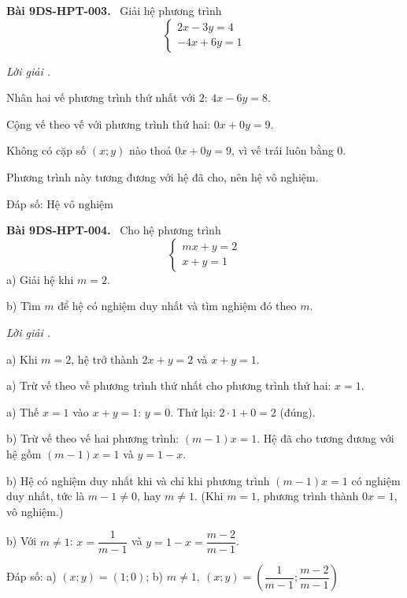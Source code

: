\documentclass[12pt,a4paper]{article}
\newenvironment{problem}[1][]{\par\medskip\noindent\textbf{Bài #1.}\ }{\par}
\newenvironment{solution}[1][]{\par\noindent\textit{Lời giải #1.}\par}{\par}
\begin{document}
\begin{problem}[9DS-HPT-003]
Giải hệ phương trình
\[ \begin{cases} 2x - 3y = 4 \\ -4x + 6y = 1 \end{cases} \]

\begin{solution}
Nhân hai vế phương trình thứ nhất với $2$: $4x - 6y = 8$.

Cộng vế theo vế với phương trình thứ hai: $0x + 0y = 9$.

Không có cặp số $(x; y)$ nào thoả $0x + 0y = 9$, vì vế trái luôn bằng $0$.

Phương trình này tương đương với hệ đã cho, nên hệ vô nghiệm.

Đáp số: $\boxed{\text{Hệ vô nghiệm}}$
\end{solution}
\end{problem}

\begin{problem}[9DS-HPT-004]
Cho hệ phương trình
\[ \begin{cases} mx + y = 2 \\ x + y = 1 \end{cases} \]
a) Giải hệ khi $m = 2$.

b) Tìm $m$ để hệ có nghiệm duy nhất và tìm nghiệm đó theo $m$.

\begin{solution}
a) Khi $m = 2$, hệ trở thành $2x + y = 2$ và $x + y = 1$.

a) Trừ vế theo vế phương trình thứ nhất cho phương trình thứ hai: $x = 1$.

a) Thế $x = 1$ vào $x + y = 1$: $y = 0$. Thử lại: $2 \cdot 1 + 0 = 2$ (đúng).

b) Trừ vế theo vế hai phương trình: $(m - 1)x = 1$. Hệ đã cho tương đương với hệ gồm $(m - 1)x = 1$ và $y = 1 - x$.

b) Hệ có nghiệm duy nhất khi và chỉ khi phương trình $(m - 1)x = 1$ có nghiệm duy nhất, tức là $m - 1 \neq 0$, hay $m \neq 1$. (Khi $m = 1$, phương trình thành $0x = 1$, vô nghiệm.)

b) Với $m \neq 1$: $x = \dfrac{1}{m - 1}$ và $y = 1 - x = \dfrac{m - 2}{m - 1}$.

Đáp số: a) $\boxed{(x; y) = (1; 0)}$; b) $\boxed{m \neq 1,\ (x; y) = \left(\dfrac{1}{m - 1}; \dfrac{m - 2}{m - 1}\right)}$
\end{solution}
\end{problem}
\end{document}
